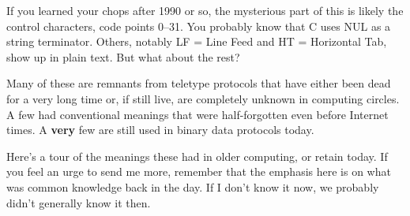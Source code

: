 \documentclass[10pt]{article}
\newcommand{\strong}[1]{\textbf{#1}}
\newcommand{\mc}{\small}
\newcommand{\acro}[1]{{\mc #1\spacefactor1000}}
\def\CEE/{\acro C}%
\begin{document}
If you learned your chops after 1990 or so, the mysterious part of this is
likely the control characters, code points 0--31. You probably know that \CEE/ uses
\acro{NUL} as a string terminator. Others, notably \acro{LF} = Line Feed and \acro{HT} = Horizontal
Tab, show up in plain text. But what about the rest?

Many of these are remnants from teletype protocols that have either been dead
for a very long time or, if still live, are completely unknown in computing
circles. A few had conventional meanings that were half-forgotten even before
Internet times. A \strong{very} few are still used in binary data protocols today.

Here's a tour of the meanings these had in older computing, or retain today. If
you feel an urge to send me more, remember that the emphasis here is on what
was common knowledge back in the day. If I don't know it now, we probably
didn't generally know it then.
\end{document}
